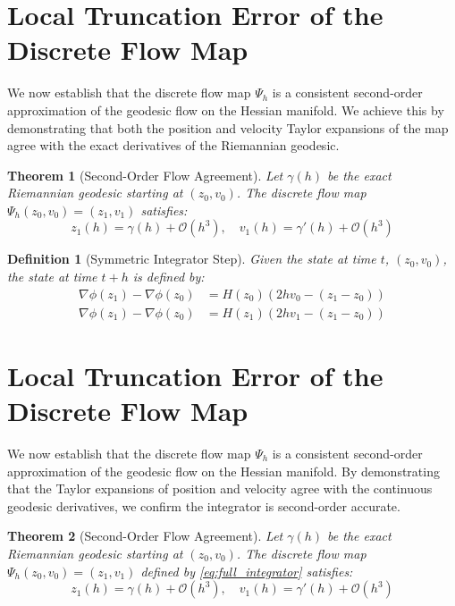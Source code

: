\documentclass[11pt,a4paper]{article}
\newtheorem{theorem}{Theorem}
\newtheorem{definition}{Definition}
\begin{document}
\section{Local Truncation Error of the Discrete Flow Map}

We now establish that the discrete flow map $\Psi_h$ is a consistent second-order approximation of the geodesic flow on the Hessian manifold. We achieve this by demonstrating that both the position and velocity Taylor expansions of the map agree with the exact derivatives of the Riemannian geodesic.

\begin{theorem}[Second-Order Flow Agreement]
Let $\gamma(h)$ be the exact Riemannian geodesic starting at $(z_0, v_0)$. The discrete flow map $\Psi_h(z_0, v_0) = (z_1, v_1)$ satisfies:
\begin{equation}
    z_1(h) = \gamma(h) + \mathcal{O}(h^3), \quad v_1(h) = \gamma'(h) + \mathcal{O}(h^3)
\end{equation}
\end{theorem}

\begin{definition}[Symmetric Integrator Step]
Given the state at time $t$, $(z_0, v_0)$, the state at time $t+h$ is defined by:
\begin{subequations}
\label{eq:full_integrator}
\begin{align}
    \nabla \phi(z_1) - \nabla \phi(z_0) &= H(z_0)(2hv_0 - (z_1 - z_0)) \label{eq:pos_update} \\
    \nabla \phi(z_1) - \nabla \phi(z_0) &= H(z_1)(2hv_1 - (z_1 - z_0)) \label{eq:vel_update}
\end{align}
\end{subequations}
\end{definition}

\section{Local Truncation Error of the Discrete Flow Map}

We now establish that the discrete flow map $\Psi_h$ is a consistent second-order approximation of the geodesic flow on the Hessian manifold. By demonstrating that the Taylor expansions of position and velocity agree with the continuous geodesic derivatives, we confirm the integrator is second-order accurate.

\begin{theorem}[Second-Order Flow Agreement]
Let $\gamma(h)$ be the exact Riemannian geodesic starting at $(z_0, v_0)$. The discrete flow map $\Psi_h(z_0, v_0) = (z_1, v_1)$ defined by \eqref{eq:full_integrator} satisfies:
\begin{equation}
    z_1(h) = \gamma(h) + \mathcal{O}(h^3), \quad v_1(h) = \gamma'(h) + \mathcal{O}(h^3)
\end{equation}
\end{theorem}
\end{document}
